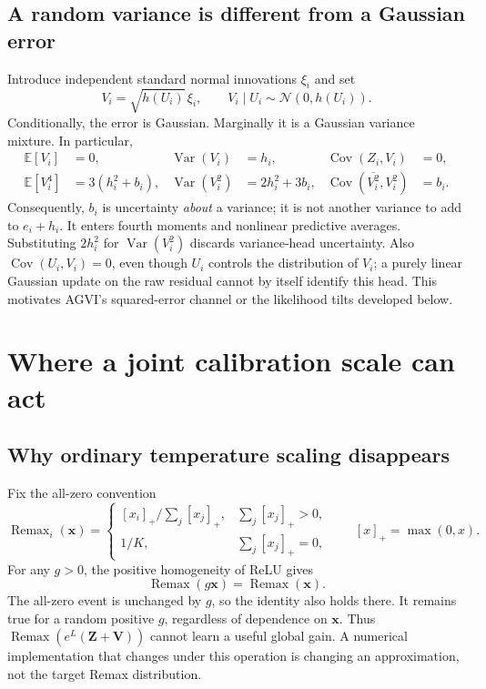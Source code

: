 \documentclass[letterpaper]{article}
\newcommand{\E}{\mathbb E}
\newcommand{\Var}{\operatorname{Var}}
\newcommand{\Cov}{\operatorname{Cov}}
\newcommand{\Normal}{\mathcal N}
\newcommand{\Remax}{\operatorname{Remax}}
\newcommand{\vbari}{\overline{V_i^2}}
\newcommand{\given}{\mid}
\begin{document}
\subsection{A random variance is different from a Gaussian error}
Introduce independent standard normal innovations $\xi_i$ and set
\begin{equation}
V_i=\sqrt{h(U_i)}\,\xi_i,\qquad
V_i\given U_i\sim\Normal(0,h(U_i)).
\label{E:noise}
\end{equation}
Conditionally, the error is Gaussian. Marginally it is a Gaussian variance mixture. In particular,
\begin{align}
\E[V_i]&=0,& \Var(V_i)&=h_i,& \Cov(Z_i,V_i)&=0,\label{E:noise2}\\
\E[V_i^4]&=3(h_i^2+b_i),&\Var(V_i^2)&=2h_i^2+3b_i,&\Cov(\vbari,V_i^2)&=b_i.
\label{E:noise4}
\end{align}
Consequently, $b_i$ is uncertainty \emph{about} a variance; it is not another variance to add to $e_i+h_i$. It enters fourth moments and nonlinear predictive averages. Substituting $2h_i^2$ for $\Var(V_i^2)$ discards variance-head uncertainty. Also $\Cov(U_i,V_i)=0$, even though $U_i$ controls the distribution of $V_i$; a purely linear Gaussian update on the raw residual cannot by itself identify this head. This motivates AGVI's squared-error channel or the likelihood tilts developed below.

\section{Where a joint calibration scale can act}\label{S:scale}
\subsection{Why ordinary temperature scaling disappears}
Fix the all-zero convention
\begin{equation}
\Remax_i(\bm x)=
\begin{cases}
[x_i]_+/\sum_j[x_j]_+,&\sum_j[x_j]_+>0,\\
1/K,&\sum_j[x_j]_+=0,
\end{cases}
\qquad [x]_+=\max(0,x).
\label{E:remax}
\end{equation}
For any $g>0$, the positive homogeneity of ReLU gives
\begin{equation}
\boxed{\Remax(g\bm x)=\Remax(\bm x).}\label{E:invariance}
\end{equation}
The all-zero event is unchanged by $g$, so the identity also holds there. It remains true for a random positive $g$, regardless of dependence on $\bm x$. Thus $\Remax(e^L(\bm Z+\bm V))$ cannot learn a useful global gain. A numerical implementation that changes under this operation is changing an approximation, not the target Remax distribution.
\end{document}

